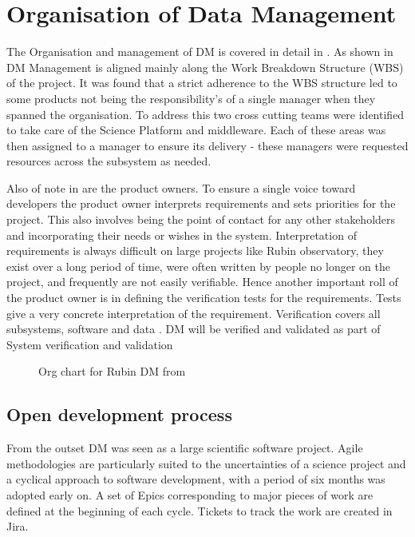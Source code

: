 
\section{Organisation of Data Management} \label{sec:org}

The Organisation and management of DM is covered in detail in \citet{LDM-294}.
As shown in  DM Management is aligned mainly along the Work Breakdown Structure (WBS) of the project.
It was found that a strict adherence to the WBS structure led to some products not being the responsibility's of a single manager when they spanned the organisation.
To address this two cross cutting teams were identified  to take care of the Science Platform and middleware.
Each of these areas was then assigned to a manager to ensure its delivery - these managers were requested resources across the subsystem as needed.

Also of note in  are the product owners.
To ensure a single voice toward developers the product owner interprets requirements and sets priorities for the
project.
This also involves being the point of contact for any other stakeholders and incorporating their needs or wishes in the system.
Interpretation of requirements is always difficult on large projects like Rubin observatory, they exist over a long period of time, were often written by people no longer on the project, and frequently are not easily verifiable.
Hence another important roll of the product owner is in defining the verification tests for the requirements.
Tests give a very concrete interpretation of the requirement.
Verification covers all subsystems, software and data  \citep{PSTN-024}.
  DM will be verified and validated as part of System verification and validation \citep{2014SPIE.9150E..0NS,PSTN-029}



\begin{figure}
\caption{Org chart for Rubin DM from \citet{LDM-294}\label{fig:org}}
\end{figure}

\subsection{Open development process}\label{sec:devproc}

From the outset DM was seen as a large scientific  software project.
Agile methodologies \citep{it:agile}  are particularly suited to the uncertainties of a science project and
a cyclical approach to software development, with a period of six months was adopted early on.
A set of Epics corresponding to major pieces of work are defined at the beginning of each cycle.
Tickets to track the work are created in Jira.

